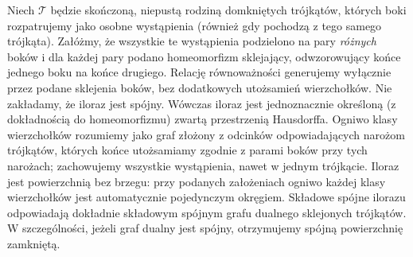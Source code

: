 \begin{stwierdzenie}
Niech $\mathcal T$ będzie skończoną, niepustą rodziną
domkniętych trójkątów, których boki rozpatrujemy jako
osobne wystąpienia (również gdy pochodzą z tego samego
trójkąta). Załóżmy, że wszystkie te wystąpienia
podzielono na pary \emph{różnych} boków i dla każdej
pary podano homeomorfizm sklejający, odwzorowujący
końce jednego boku na końce drugiego.
Relację równoważności generujemy wyłącznie przez
podane sklejenia boków, bez dodatkowych utożsamień
wierzchołków. Nie zakładamy, że iloraz jest spójny.
Wówczas iloraz jest jednoznacznie określoną
(z dokładnością do homeomorfizmu) zwartą
przestrzenią Hausdorffa. Ogniwo klasy wierzchołków
rozumiemy jako graf złożony z odcinków odpowiadających
narożom trójkątów, których końce utożsamiamy zgodnie
z parami boków przy tych narożach; zachowujemy
wszystkie wystąpienia, nawet w jednym trójkącie.
Iloraz jest powierzchnią bez brzegu: przy podanych
założeniach ogniwo każdej klasy wierzchołków jest
automatycznie pojedynczym okręgiem.
Składowe spójne ilorazu odpowiadają dokładnie
składowym spójnym grafu dualnego sklejonych
trójkątów. W szczególności, jeżeli graf dualny jest
spójny, otrzymujemy spójną powierzchnię zamkniętą.
\end{stwierdzenie}

